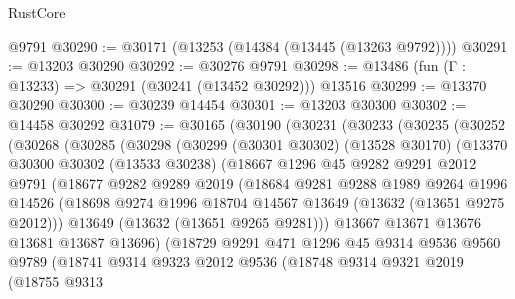 \begin{lexlean}{RustCore}
\begin{coremodule}
    @9791
@30290 := @30171 (@13253 (@14384 (@13445 (@13263 @9792))))
@30291 := @13203 @30290
@30292 := @30276 @9791
@30298 := @13486 (fun (Γ : @13233) => @30291 (@30241 (@13452 @30292))) @13516
@30299 := @13370 @30290
@30300 := @30239 @14454
@30301 := @13203 @30300
@30302 := @14458 @30292
@31079 := @30165
    (@30190
      (@30231
        (@30233
          (@30235
            (@30252
              (@30268
                (@30285
                  (@30298
                    (@30299
                      (@30301 @30302)
                      (@13528 @30170)
                      (@13370
                        @30300
                        @30302
                        (@13533 @30238)
                        (@18667
                          @1296
                          @45
                          @9282
                          @9291
                          @2012
                          @9791
                          (@18677
                            @9282
                            @9289
                            @2019
                            (@18684
                              @9281
                              @9288
                              @1989
                              @9264
                              @1996
                              @14526
                              (@18698
                                @9274
                                @1996
                                @18704
                                @14567
                                @13649
                                (@13632 (@13651 @9275 @2012)))
                              @13649
                              (@13632 (@13651 @9265 @9281)))
                            @13667
                            @13671
                            @13676
                            @13681
                            @13687
                            @13696)
                          (@18729
                            @9291
                            @471
                            @1296
                            @45
                            @9314
                            @9536
                            @9560
                            @9789
                            (@18741
                              @9314
                              @9323
                              @2012
                              @9536
                              (@18748
                                @9314
                                @9321
                                @2019
                                (@18755
                                  @9313

\end{coremodule}
\end{lexlean}
